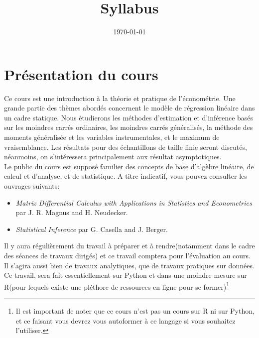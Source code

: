 
\title{Syllabus}
\date{\today}

\maketitle
\section*{ Présentation du cours}
Ce cours est une introduction  à la théorie et pratique de l'économétrie. Une grande partie des thèmes abordés concernent le modèle de régression linéaire dans un cadre statique. Nous étudierons les méthodes d'estimation et d'inférence basés sur les moindres carrés ordinaires, les moindres carrés généralisés, la méthode des moments généralisée et les variables instrumentales, et le maximum de vraisemblance. Les résultats pour des échantillons de taille finie seront discutés, néanmoins, on s'intéressera principalement aux résultat asymptotiques.\\
Le public du cours est supposé familier des concepts de base d'algèbre linéaire, de calcul et d'analyse, et de statistique. A titre indicatif, vous pouvez consulter les ouvrages suivants:
\begin{itemize}
\item \emph{Matrix Differential Calculus with Applications in Statistics and Econometrics} par J. R. Magnus and H. Neudecker.
\item \emph{Statistical Inference} par  G. Casella and J. Berger.
\end{itemize}
Il y aura régulièrement du travail à préparer et à rendre(notamment
dans le cadre des séances de travaux dirigés) et ce travail comptera
pour l'évaluation au cours. Il s'agira aussi bien de travaux
analytiques, que de travaux pratiques sur données. Ce travail,
sera fait essentiellement sur Python et dans une moindre mesure sur R(pour lequels existe une pléthore de ressources en
ligne pour se former)\footnote{Il est important de noter que ce cours
  n'est pas un cours sur R ni sur Python, et ce faisant vous devrez vous autoformer à ce langage si vous souhaitez l'utiliser.}


